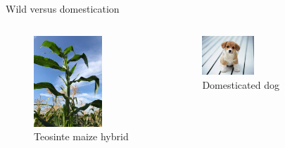 \documentclass[11pt,ignorenonframetext,aspectratio=169]{beamer}
\begin{document}
\begin{frame}{Wild versus domestication}
\protect\hypertarget{wild-versus-domestication}{}
\begin{columns}[T,onlytextwidth]

\begin{figure}

{\centering \includegraphics[width=0.7\textwidth, keepaspectratio,height=0.8\textheight]{./images/Teosinte_maize_hybrid_cross} 

}

\caption{Teosinte maize hybrid}\label{fig:unnamed-chunk-1}
\end{figure}


\begin{figure}
\includegraphics[width=0.4\textwidth, keepaspectratio]{./images/domestic_dog_puppy} \caption{Domesticated dog}\label{fig:domesticated}
\end{figure}



\end{columns}
\end{frame}
\end{document}
